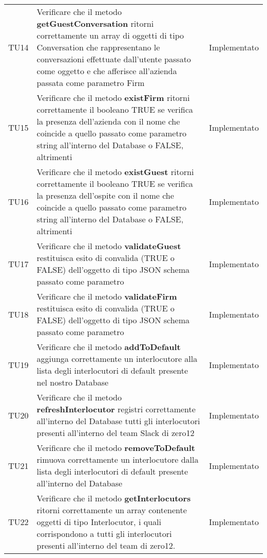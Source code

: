 \documentclass[../PianoDiQualifica_v3.0.0.tex]{subfiles}
\begin{document}
\begin{longtable}[c] { >{\centering\arraybackslash}p{2cm} p{9cm} >{\centering\arraybackslash}p{4cm}}
			\addlinespace[0.3em]
			\midrule
			\addlinespace[0.3em]
			TU14 & Verificare che il metodo \textbf{getGuestConversation} ritorni correttamente un array di oggetti di tipo Conversation che rappresentano le conversazioni effettuate dall'utente passato come oggetto e che afferisce all'azienda passata come parametro Firm & Implementato \\
			\addlinespace[0.3em]
			\midrule
			\addlinespace[0.3em]
			TU15 & Verificare che il metodo \textbf{existFirm} ritorni correttamente il booleano TRUE se verifica la presenza dell'azienda con il nome che coincide a quello passato come parametro string all'interno del Database o FALSE, altrimenti & Implementato \\
			\addlinespace[0.3em]
			\midrule
			\addlinespace[0.3em]
			TU16 & Verificare che il metodo \textbf{existGuest} ritorni correttamente il booleano TRUE se verifica la presenza dell'ospite con il nome che coincide a quello passato come parametro string all'interno del Database o FALSE, altrimenti & Implementato \\
			\addlinespace[0.3em]
			\midrule
			\addlinespace[0.3em]
			TU17 & Verificare che il metodo \textbf{validateGuest} restituisca esito di convalida (TRUE o FALSE) dell'oggetto di tipo JSON schema passato come parametro & Implementato \\
			\addlinespace[0.3em]
			\midrule
			\addlinespace[0.3em]
			TU18 & Verificare che il metodo \textbf{validateFirm} restituisca esito di convalida (TRUE o FALSE) dell'oggetto di tipo JSON schema passato come parametro & Implementato \\
			\addlinespace[0.3em]
			\midrule
			\addlinespace[0.3em]
			TU19 & Verificare che il metodo \textbf{addToDefault} aggiunga correttamente un interlocutore alla lista degli interlocutori di default presente nel nostro Database & Implementato \\
			\addlinespace[0.3em]
			\midrule
			\addlinespace[0.3em]
			TU20 & Verificare che il metodo \textbf{refreshInterlocutor} registri correttamente all'interno del Database tutti gli interlocutori presenti all'interno del team Slack di zero12 & Implementato \\
			\addlinespace[0.3em]
			\midrule
			\addlinespace[0.3em]
			TU21 & Verificare che il metodo \textbf{removeToDefault} rimuova correttamente un interlocutore dalla lista degli interlocutori di default presente all'interno del Database & Implementato \\
			\addlinespace[0.3em]
			\midrule
			\addlinespace[0.3em]
			TU22 & Verificare che il metodo \textbf{getInterlocutors} ritorni correttamente un array contenente oggetti di tipo Interlocutor, i quali corrispondono a tutti gli interlocutori presenti all'interno del team di zero12. & Implementato \\

\end{longtable}
\end{document}
